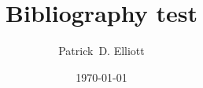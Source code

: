 \documentclass[a4paper,12pt]{article}
\title{Bibliography test}
\author{Patrick~D. Elliott}
\date{\today}
\begin{document}
\maketitle

\nocite{*}

\printbibliography
\end{document}
